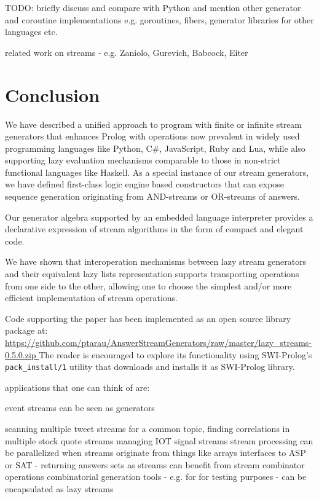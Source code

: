 \documentclass{new_tlp}
\begin{document}

{\Large TODO: briefly discuss and compare with Python and mention other generator and coroutine implementations e.g. goroutines, fibers, generator libraries for other languages etc.}


{\Large related work on streams - e.g. Zaniolo, Gurevich,  Babcock, Eiter}

\section{Conclusion}

We have described a unified approach to program with finite or infinite stream generators
that enhances Prolog with operations now prevalent in widely used programming languages
like Python, C\#, JavaScript, Ruby and Lua, while also supporting lazy evaluation mechanisms comparable to those in non-strict functional languages like Haskell.
As a special instance of our stream generators,
we have defined first-class logic engine based constructors 
that can expose sequence  generation
originating from AND-streams or OR-streams of answers.

Our generator algebra supported by an embedded language interpreter provides
a declarative expression of stream algorithms in the form of compact and elegant code.

We have shown that interoperation mechanisms 
between lazy stream generators and their 
equivalent lazy lists representation
supports transporting operations from one side to the other,
allowing one to choose the simplest and/or more efficient
implementation of stream operations.

Code supporting the paper has been implemented as an open source library package at:\\
{\small \url{https://github.com/ptarau/AnswerStreamGenerators/raw/master/lazy_streams-0.5.0.zip } }
The reader is encouraged to explore its functionality using SWI-Prolog's {\tt pack\_install/1} utility that downloads and installs it as SWI-Prolog library.



\BI
\I  applications that one can think of are:
\BI

\I event streams can be seen as generators 

\I scanning multiple tweet streams for a common topic, 
\I finding correlations in multiple stock quote streams 
\I managing IOT signal streams
\I stream processing  can be parallelized when streams originate from things like arrays
\I interfaces to ASP or SAT - returning answers sets as streams can benefit from stream combinator operations
\I combinatorial generation tools - e.g. for for testing purposes - can be encapsulated as lazy streams
\EI
\EI





\end{document}

